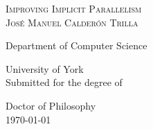 \begin{titlepage}
\begin{center}

\textsc{\LARGE Improving Implicit Parallelism}\\[1.5cm]

\textsc{\large Jos\'{e} Manuel Calder\'{o}n Trilla}\\[1,5cm]

\vfill

Department of Computer Science\par
University of York \\[1,3cm]


Submitted for the degree of\par
Doctor of Philosophy \\[1,3cm]

\today%


\end{center}
\end{titlepage}
